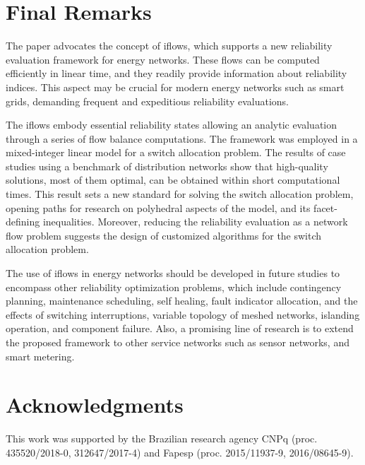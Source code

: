 \vspace{-3.0mm}
\section{Final Remarks} \label{sec:Conclusions}

The paper advocates the concept of iflows, which supports a new reliability evaluation framework for energy networks. These flows can be computed efficiently in linear time, and they readily provide information about reliability indices. This aspect may be crucial for modern energy networks such as smart grids, demanding frequent and expeditious reliability evaluations.

The iflows embody essential reliability states allowing an analytic evaluation through a series of flow balance computations.
The framework was employed in a mixed-integer linear model for a switch allocation problem. 
The results of case studies using a benchmark of distribution networks show 
that high-quality solutions, most of them optimal, can be  obtained within
short computational times. This result sets a new standard for solving the switch allocation problem, opening  paths for research on polyhedral aspects of the model, and its facet-defining inequalities. Moreover, reducing the reliability evaluation as a network flow problem suggests the design of customized algorithms for the switch allocation problem.


The use of iflows in energy
networks should be developed in future studies to encompass other reliability optimization problems, which include contingency planning, maintenance scheduling, self healing, fault indicator allocation, and the effects of switching interruptions, variable topology of meshed networks, islanding operation, and component failure. 
Also, a promising line of research is to extend the proposed framework to other service networks such as sensor networks, and smart metering.



\section*{Acknowledgments}
This work was supported by the Brazilian research agency CNPq (proc. 435520/2018-0, 312647/2017-4) and Fapesp (proc. 2015/11937-9, 2016/08645-9).





